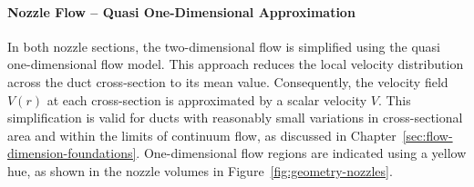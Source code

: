 \paragraph{Nozzle Flow -- Quasi One-Dimensional Approximation}
	In both nozzle sections, the two-dimensional flow is simplified using the quasi one-dimensional flow model.
	This approach reduces the local velocity distribution across the duct cross-section to its mean value.
	Consequently, the velocity field $V(r)$ at each cross-section is approximated by a scalar velocity $V$.
	This simplification is valid for ducts with reasonably small variations in cross-sectional area and within the limits of continuum flow, as discussed in Chapter~\ref{sec:flow-dimension-foundations}.
	One-dimensional flow regions are indicated using a yellow hue, as shown in the nozzle volumes in Figure~\ref{fig:geometry-nozzles}.
	\cite{anderson2021modern}
	\newpage

